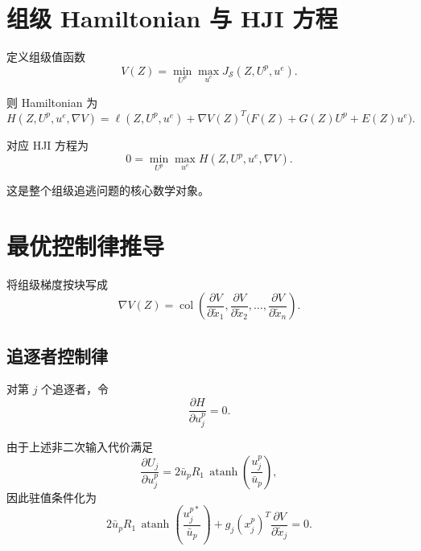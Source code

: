 ﻿\documentclass[12pt,a4paper]{ctexart}
\begin{document}
\section{组级 Hamiltonian 与 HJI 方程}

定义组级值函数
\begin{equation}
    V(Z)=\min_{U^p}\max_{u^e} J_{\mathcal S}(Z,U^p,u^e).
\end{equation}

则 Hamiltonian 为
\begin{equation}
    H(Z,U^p,u^e,\nabla V)
    =
    \ell(Z,U^p,u^e)
    +
    \nabla V(Z)^T\big(F(Z)+G(Z)U^p+E(Z)u^e\big).
\end{equation}

对应 HJI 方程为
\begin{equation}
    0 = \min_{U^p}\max_{u^e} H(Z,U^p,u^e,\nabla V).
\end{equation}

这是整个组级追逃问题的核心数学对象。

\section{最优控制律推导}

将组级梯度按块写成
\begin{equation}
    \nabla V(Z)
    =
    \operatorname{col}\left(
    \frac{\partial V}{\partial \tilde x_1},
    \frac{\partial V}{\partial \tilde x_2},
    \dots,
    \frac{\partial V}{\partial \tilde x_n}
    \right).
\end{equation}

\subsection{追逐者控制律}

对第 $j$ 个追逐者，令
\begin{equation}
    \frac{\partial H}{\partial u_j^p}=0.
\end{equation}

由于上述非二次输入代价满足
\begin{equation}
    \frac{\partial U_j}{\partial u_j^p}
    =
    2\bar u_p R_1\,\operatorname{atanh}\!\left(\frac{u_j^p}{\bar u_p}\right),
\end{equation}
因此驻值条件化为
\begin{equation}
    2\bar u_p R_1\,\operatorname{atanh}\!\left(\frac{u_j^{p*}}{\bar u_p}\right)
    +
    g_j(x_j^p)^T\frac{\partial V}{\partial \tilde x_j}=0.
\end{equation}
\end{document}

